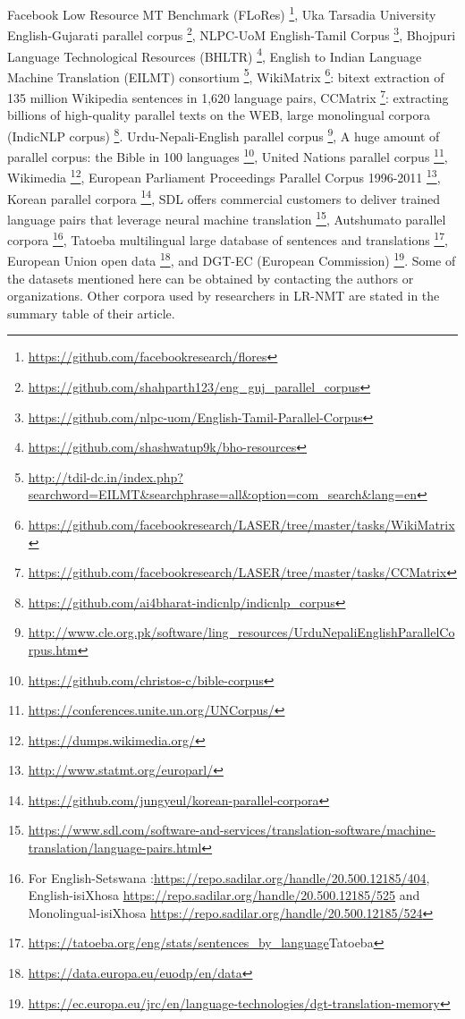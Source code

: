 \documentclass[manuscript,screen]{acmart}
\begin{document}
Facebook Low Resource MT Benchmark (FLoRes) \footnote{\url{ https://github.com/facebookresearch/flores}}, Uka Tarsadia University English-Gujarati parallel corpus \footnote{\url{ https://github.com/shahparth123/eng\_guj\_parallel\_corpus}}, NLPC-UoM English-Tamil Corpus \footnote{\url{ https://github.com/nlpc-uom/English-Tamil-Parallel-Corpus}}, 
Bhojpuri Language Technological Resources (BHLTR) 
\footnote{\url{https://github.com/shashwatup9k/bho-resources}}, English to Indian Language Machine Translation (EILMT) consortium \footnote{\url{http://tdil-dc.in/index.php?searchword=EILMT&searchphrase=all&option=com_search&lang=en}}, 
WikiMatrix \footnote{\url{https://github.com/facebookresearch/LASER/tree/master/tasks/WikiMatrix}}: bitext extraction of 135 million Wikipedia sentences in 1,620 language pairs, CCMatrix \footnote{\url{https://github.com/facebookresearch/LASER/tree/master/tasks/CCMatrix}}: extracting billions of high-quality parallel texts on the WEB, large monolingual corpora (IndicNLP corpus) \footnote{\url{https://github.com/ai4bharat-indicnlp/indicnlp\_corpus}}. Urdu-Nepali-English parallel corpus  \footnote{\url{http://www.cle.org.pk/software/ling\_resources/UrduNepaliEnglishParallelCorpus.htm}}, A huge amount of parallel corpus: the Bible in 100 languages \footnote{\url{https://github.com/christos-c/bible-corpus}}, United Nations parallel corpus \footnote{\url{https://conferences.unite.un.org/UNCorpus/}}, Wikimedia \footnote{\url{https://dumps.wikimedia.org/}}, European Parliament Proceedings Parallel Corpus 1996-2011 \footnote{\url{http://www.statmt.org/europarl/}}, Korean parallel corpora \footnote{\url{https://github.com/jungyeul/korean-parallel-corpora}}, SDL offers commercial customers to deliver trained language pairs that leverage neural machine translation \footnote{\url{https://www.sdl.com/software-and-services/translation-software/machine-translation/language-pairs.html}}, Autshumato parallel corpora \footnote{For English-Setswana :\url{https://repo.sadilar.org/handle/20.500.12185/404}, English-isiXhosa \url{https://repo.sadilar.org/handle/20.500.12185/525} and Monolingual-isiXhosa \url{https://repo.sadilar.org/handle/20.500.12185/524}}, Tatoeba multilingual large database of sentences and translations \footnote{\url{https://tatoeba.org/eng/stats/sentences_by_language}{Tatoeba}}, European Union open data \footnote{\url{https://data.europa.eu/euodp/en/data}}, and DGT-EC (European Commission) \footnote{\url{https://ec.europa.eu/jrc/en/language-technologies/dgt-translation-memory}}. Some of the datasets mentioned here can be obtained by contacting the authors or organizations. Other corpora used by researchers in LR-NMT are stated in the summary table of their article.
\end{document}
